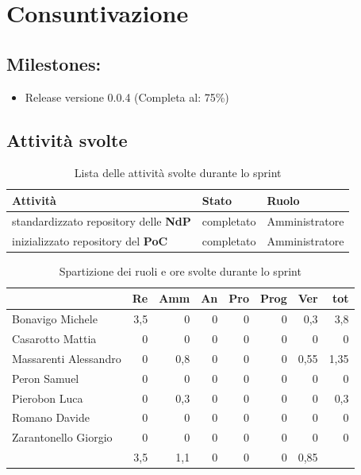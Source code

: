 \section{Consuntivazione}

\subsection{Milestones:}
\begin{itemize}
    \item Release versione 0.0.4 (Completa al: 75\%)
\end{itemize}

\subsection{Attività svolte}

\begin{table}[ht]
    \begin{tabularx}{\textwidth}{X l l}
        
        \rowcolor{gray!30} \textbf{Attività} & \textbf{Stato} & \textbf{Ruolo}\\
        
        \hline
        standardizzato repository delle \textbf{NdP} & completato & Amministratore\\
        inizializzato repository del \textbf{PoC} & completato & Amministratore\\
        \end{tabularx}
    \caption{Lista delle attività svolte durante lo sprint}
\end{table}


\begin{table}[ht]
    \begin{tabularx}{\linewidth}{X|rrrrrrr}
    \rowcolor{gray!30}& Re & Amm & An & Pro & Prog & Ver & tot \\
    \hline
    Bonavigo Michele                        & 3,5 & 0 & 0 & 0 & 0 & 0,3  & 3,8 \\
    \rowcolor{gray!10}Casarotto Mattia      & 0 & 0 & 0 & 0 & 0 & 0  & 0 \\
    Massarenti Alessandro                   & 0 & 0,8 & 0 & 0 & 0 & 0,55  & 1,35 \\
    \rowcolor{gray!10}Peron Samuel          & 0 & 0 & 0 & 0 & 0 & 0 & 0 \\
    Pierobon Luca                           & 0 & 0,3 & 0 & 0 & 0 & 0 & 0,3 \\
    \rowcolor{gray!10}Romano Davide         & 0 & 0 & 0 & 0 & 0 & 0 & 0 \\
    Zarantonello Giorgio                    & 0 & 0 & 0 & 0 & 0 & 0 & 0 \\
    \hline                                  & 3,5 & 1,1 & 0 & 0 & 0 & 0,85 & 
    \end{tabularx}
    \caption{\label{ruoli-persone}Spartizione dei ruoli e ore svolte durante lo sprint}
\end{table}

